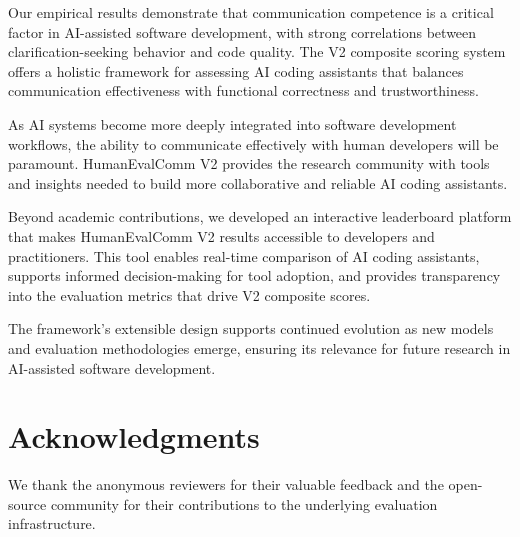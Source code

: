 \documentclass[conference]{IEEEtran}
\begin{document}
Our empirical results demonstrate that communication competence is a critical factor in AI-assisted software development, with strong correlations between clarification-seeking behavior and code quality. The V2 composite scoring system offers a holistic framework for assessing AI coding assistants that balances communication effectiveness with functional correctness and trustworthiness.

As AI systems become more deeply integrated into software development workflows, the ability to communicate effectively with human developers will be paramount. HumanEvalComm V2 provides the research community with tools and insights needed to build more collaborative and reliable AI coding assistants.

Beyond academic contributions, we developed an interactive leaderboard platform that makes HumanEvalComm V2 results accessible to developers and practitioners. This tool enables real-time comparison of AI coding assistants, supports informed decision-making for tool adoption, and provides transparency into the evaluation metrics that drive V2 composite scores.

The framework's extensible design supports continued evolution as new models and evaluation methodologies emerge, ensuring its relevance for future research in AI-assisted software development.

\section*{Acknowledgments}

We thank the anonymous reviewers for their valuable feedback and the open-source community for their contributions to the underlying evaluation infrastructure.



\end{document}
